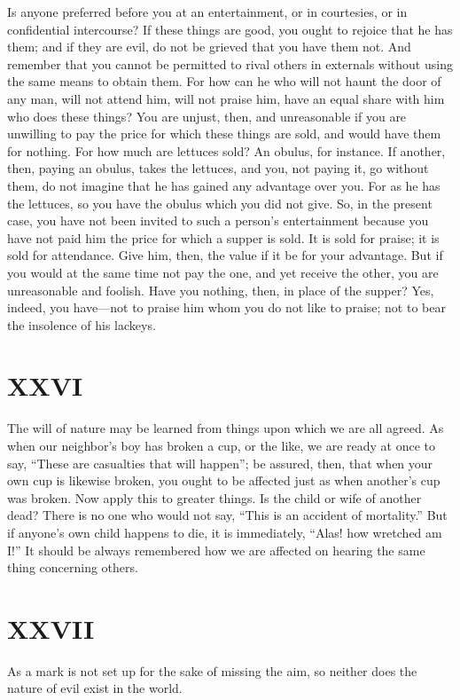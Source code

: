 \documentclass[11pt]{article}
\begin{document}
Is anyone preferred before you at an entertainment, or in courtesies, or in confidential intercourse? If these things are good, you ought to rejoice that he has them; and if they are evil, do not be grieved that you have them not. And remember that you cannot be permitted to rival others in externals without using the same means to obtain them. For how can he who will not haunt the door of any man, will not attend him, will not praise him, have an equal share with him who does these things? You are unjust, then, and unreasonable if you are unwilling to pay the price for which these things are sold, and would have them for nothing. For how much are lettuces sold? An obulus, for instance. If another, then, paying an obulus, takes the lettuces, and you, not paying it, go without them, do not imagine that he has gained any advantage over you. For as he has the lettuces, so you have the obulus which you did not give. So, in the present case, you have not been invited to such a person’s entertainment because you have not paid him the price for which a supper is sold. It is sold for praise; it is sold for attendance. Give him, then, the value if it be for your advantage. But if you would at the same time not pay the one, and yet receive the other, you are unreasonable and foolish. Have you nothing, then, in place of the supper? Yes, indeed, you have—not to praise him whom you do not like to praise; not to bear the insolence of his lackeys.
\section*{XXVI}

The will of nature may be learned from things upon which we are all agreed. As when our neighbor’s boy has broken a cup, or the like, we are ready at once to say, “These are casualties that will happen”; be assured, then, that when your own cup is likewise broken, you ought to be affected just as when another’s cup was broken. Now apply this to greater things. Is the child or wife of another dead? There is no one who would not say, “This is an accident of mortality.” But if anyone’s own child happens to die, it is immediately, “Alas! how wretched am I!” It should be always remembered how we are affected on hearing the same thing concerning others.
\section*{XXVII}

As a mark is not set up for the sake of missing the aim, so neither does the nature of evil exist in the world.
\end{document}
